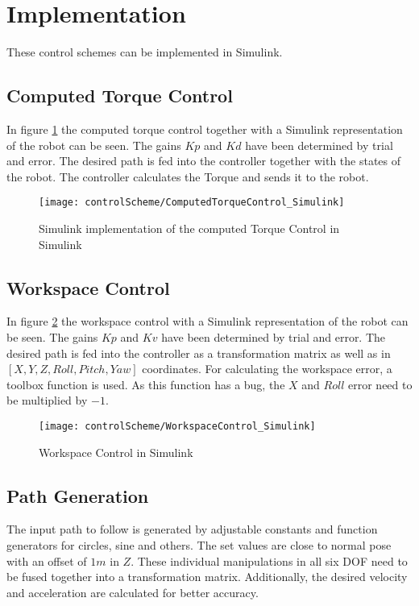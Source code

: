\section{Implementation}

These control schemes can be implemented in Simulink.  

\subsection{Computed Torque Control}
In figure \ref{fig:CompTorqueContr} the computed torque control together with a Simulink representation of the robot can be seen. 
The gains $Kp$ and $Kd$ have been determined by trial and error. 
The desired path is fed into the controller together with the states of the robot. The controller calculates the Torque and sends it to the robot.


\begin{figure}[H]
	\texttt{[image: controlScheme/ComputedTorqueControl\_Simulink]}
	\caption{Simulink implementation of the computed Torque Control in Simulink}
	\label{fig:CompTorqueContr}
\end{figure}



\subsection{Workspace Control}
In figure \ref{fig:WorkSpaceContr} the workspace control with a Simulink representation of the robot can be seen.
The gains $Kp$ and $Kv$ have been determined by trial and error.
The desired path is fed into the controller as a transformation matrix as well as in $[X,Y,Z,Roll,Pitch,Yaw]$ coordinates.
For calculating the workspace error, a toolbox function is used. As this function has a bug, the $X$ and $Roll$ error need to be multiplied by $-1$.

\begin{figure}[H]
	\texttt{[image: controlScheme/WorkspaceControl\_Simulink]}
	\caption{Workspace Control in Simulink}
	\label{fig:WorkSpaceContr}
\end{figure}


\subsection{Path Generation}
The input path to follow is generated by adjustable constants and function generators for circles, sine and others. 
The set values are close to normal pose with an offset of $1m$ in $Z$.
These individual manipulations in all six \ac{DOF} need to be fused together into a transformation matrix. 
Additionally, the desired velocity and acceleration are calculated for better accuracy. 

